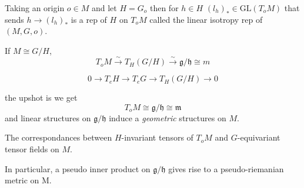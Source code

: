 Taking an origin $o \in M$ and let $H = G_o$ then for $h \in H$
$(l_h)_* \in \mathrm{GL}(T_oM)$
that sends $h \rightarrow (l_h)_*$ is a rep of $H$ on $T_oM$ called the linear isotropy rep of $(M,G,o)$.

If $M \cong G/H$, 
\begin{equation}
    T_oM \xrightarrow{\sim} T_H(G/H) \xrightarrow{\sim } \mathfrak{g}/ \mathfrak{h} \cong m
\end{equation}

\begin{equation}
     0\rightarrow T_eH \rightarrow T_eG \rightarrow T_H(G/H) \rightarrow 0
\end{equation}

the upshot is we get 
\begin{equation}
    T_oM \cong \mathfrak{g}/ \mathfrak{h} \cong \mathfrak{m}
\end{equation}
and linear structures on $\mathfrak{g}/\mathfrak{h}$ induce a \textit{geometric } structures on $M$.

The correspondances between $H$-invariant tensors of $T_oM$ and $G$-equivariant tensor fields on $M$.

In particular, a pseudo inner product on $\mathfrak{g}/\mathfrak{h}$ gives rise to a pseudo-riemanian metric on M.

\label{ex:}

